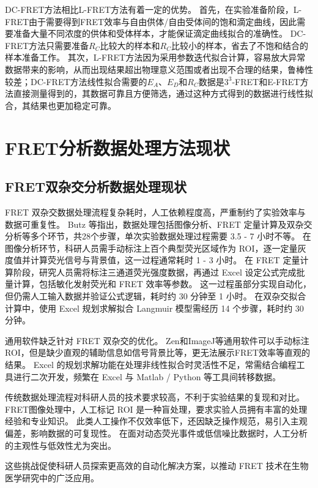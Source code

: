DC-FRET方法相比L-FRET方法有着一定的优势。
首先，在实验准备阶段，L-FRET由于需要得到FRET效率与自由供体/自由受体间的饱和滴定曲线，因此需要准备大量不同浓度的供体和受体样本，才能保证滴定曲线拟合的准确性。
DC-FRET方法只需要准备$R_C$比较大的样本和$R_C$比较小的样本，省去了不饱和结合的样本准备工作。
其次，L-FRET方法因为采用参数迭代拟合计算，容易放大异常数据带来的影响，从而出现结果超出物理意义范围或者出现不合理的结果，鲁棒性较差；DC-FRET方法线性拟合需要的$E_A$、$E_D$和$R_C$数据是$3^3$-FRET和E-FRET方法直接测量得到的，其数据可靠且方便筛选，通过这种方式得到的数据进行线性拟合，其结果也更加稳定可靠。

\section{FRET分析数据处理方法现状}

\subsection{FRET双杂交分析数据处理现状}
FRET 双杂交数据处理流程复杂耗时，人工依赖程度高，严重制约了实验效率与数据可重复性。
Butz 等指出，数据处理包括图像分析、FRET 定量计算及双杂交分析等多个环节，共28个步骤，单次实验数据处理过程需要 3.5 - 7 小时不等。
在图像分析环节，科研人员需手动标注上百个典型荧光区域作为 ROI，逐一定量灰度值并计算荧光信号与背景值，这一过程通常耗时 1 - 3 小时。
在 FRET 定量计算阶段，研究人员需将标注三通道荧光强度数据，再通过 Excel 设定公式完成批量计算，包括敏化发射荧光和 FRET 效率等参数。
这一过程虽部分实现自动化，但仍需人工输入数据并验证公式逻辑，耗时约 30 分钟至 1 小时。
在双杂交拟合计算中，使用 Excel 规划求解拟合 Langmuir 模型需经历 14 个步骤，耗时约 30 分钟。

通用软件缺乏针对 FRET 双杂交的优化。
Zen和ImageJ等通用软件可以手动标注ROI，但是缺少直观的辅助信息如信号背景比等，更无法展示FRET效率等直观的结果。
Excel 的规划求解功能在处理非线性拟合时灵活性不足，常需结合编程工具进行二次开发，频繁在 Excel 与 Matlab / Python 等工具间转移数据。

传统数据处理流程对科研人员的技术要求较高，不利于实验结果的复现和对比。
FRET图像处理中，人工标记 ROI 是一种盲处理，要求实验人员拥有丰富的处理经验和专业知识。
此类人工操作不仅效率低下，还因缺乏操作规范，易引入主观偏差，影响数据的可复现性。
在面对动态荧光事件或低信噪比数据时，人工分析的主观性与低效性尤为突出。

这些挑战促使科研人员探索更高效的自动化解决方案，以推动 FRET 技术在生物医学研究中的广泛应用。

